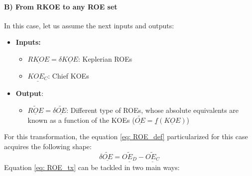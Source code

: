 \paragraph{B) From RKOE to any ROE set\\}
% 
\indent In this case, let us assume the next inputs and outputs:
%
\begin{itemize}
\item \textbf{Inputs:}
	\begin{itemize}
	\item $\underline{RKOE} = \delta \underline{KOE}$: Keplerian ROEs
	\item $\underline{KOE_{C}}$: Chief KOEs
	\end{itemize}
%
\item \textbf{Output}: 
	\begin{itemize}
	\item $\underline{\widetilde{ROE}}= \delta \underline{\widetilde{OE}}$: Different type of ROEs, whose absolute equivalents are known as a function of the KOEs ($\underline{\widetilde{OE}} = \underline{f} \left( \underline{KOE}\right)$) 
	\end{itemize}

\end{itemize}
%
\indent For this transformation, the equation \ref{eq:	ROE_def} particularized for this case acquires the following shape:
%
\begin{equation}
\delta\underline{\widetilde{OE}} = \underline{\widetilde{OE_D}} - \underline{\widetilde{OE_C}}
\label{eq: 	ROE_tx}
\end{equation}
%
\indent Equation \ref{eq: 	ROE_tx} can be tackled in two main ways:
%
